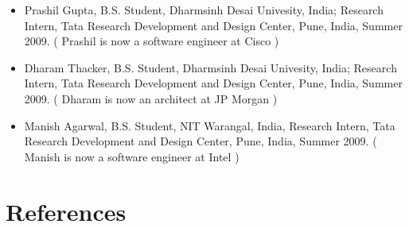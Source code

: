 \documentclass[letterpaper,11pt]{article}
\begin{document}
\begin{itemize}
\vspace{0pt}\item\small{Prashil Gupta, B.S. Student, Dharmsinh Desai Univesity, India;  Research Intern, Tata Research Development and Design Center, Pune, India, Summer 2009. ( Prashil is now a software engineer at Cisco )} \\
\vspace{0pt}\item\small{Dharam Thacker, B.S. Student, Dharmsinh Desai Univesity, India;  Research Intern, Tata Research Development and Design Center, Pune, India, Summer 2009. ( Dharam is now an architect at JP Morgan ) }\\
\vspace{0pt}\item\small{Manish Agarwal, B.S. Student, NIT Warangal, India, Research Intern, Tata Research Development and Design Center, Pune, India, Summer 2009. ( Manish is now a software engineer at Intel )} \\

\end{itemize}

\section{References}
\end{document}
